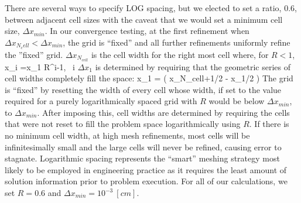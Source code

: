 There are several ways to specify LOG spacing, but we elected to set a ratio, $0.6$, between adjacent cell sizes with the caveat that we would set a minimum cell size, $\Delta x_{min}$.
In our convergence testing, at the first refinement when $\Delta x_{N_cell} < \Delta x_{min}$, the grid is ``fixed'' and all further refinements uniformly refine the ''fixed'' grid.  $\Delta x_{N_{cell}}$ is the cell width for the right most cell where, for $R < 1$,
\benum
\Delta x_i =\Delta x_1 R^{i-1}, ~i\in[1,N_{cell}] \pep
\eenum
$\Delta x_1$ is determined by requiring that the geometric series of cell widths completely fill the space:
\benum
\Delta x_1 = \left( x_{N_{cell}+1/2} - x_{1/2} \right) 
\eenum
The grid is ``fixed'' by resetting the width of every cell whose width, if set to the value required for a purely logarithmically spaced grid with $R$ would be below  $\Delta x_{min}$, to $\Delta x_{min}$. 
After imposing this, cell widths are determined by requiring the cells that were not reset to fill the problem space logarithmically using $R$.
If there is no minimum cell width, at high mesh refinements, most cells will be infinitesimally small and the large cells will never be refined, causing error to stagnate. 
Logarithmic spacing represents the ``smart'' meshing strategy most likely to be employed in engineering practice as it requires the least amount of solution information prior to problem execution.  
For all of our calculations, we set $R=0.6$ and $\Delta x_{min} = 10^{-3}~[cm]$.


